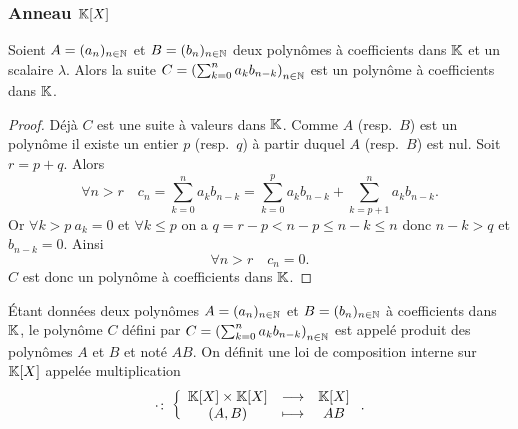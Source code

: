 \subsubsection{Anneau \(\mathbb{K}[X]\)}

\begin{lemme}
  Soient \(A = (a_n)_{n \in \mathbb{N}}\) et \(B = (b_n)_{n \in \mathbb{N}}\) deux polynômes à
  coefficients dans \(\mathbb{K}\) et un scalaire \(\lambda\). Alors la suite \(C =
  \left(\sum_{k = 0}^n a_kb_{n-k}\right)_{n \in \mathbb{N}}\) est un polynôme à
  coefficients dans \(\mathbb{K}\).
\end{lemme}
\begin{proof}
  Déjà \(C\) est une suite à valeurs dans \(\mathbb{K}\). Comme \(A\) (resp.\ \(B\)) est
  un polynôme il existe un entier \(p\) (resp.\ \(q\)) à partir duquel \(A\)
  (resp.\ \(B\)) est nul. Soit \(r = p+q\). Alors
  \begin{equation}
    \forall n>r \quad c_n = \sum_{k = 0}^n a_kb_{n-k} = \sum_{k = 0}^p a_kb_{n-k} +
    \sum_{k = p+1}^n a_kb_{n-k}.
  \end{equation}
  Or \(\forall k>p \ a_k = 0\) et \(\forall k \leqslant p\) on a \(q = r-p <n-p
  \leqslant n-k \leqslant n\) donc \(n-k>q\) et \(b_{n-k} = 0\). Ainsi
  \begin{equation}
    \forall n>r \quad c_n = 0.
  \end{equation}
  \(C\) est donc un polynôme à coefficients dans \(\mathbb{K}\).
\end{proof}

\begin{defdef}
  Étant données deux polynômes \(A = (a_n)_{n \in \mathbb{N}}\) et \(B = (b_n)_{n \in \mathbb{N}}\)
  à coefficients dans \(\mathbb{K}\), le polynôme \(C\) défini par \(C =
  \left(\sum_{k = 0}^n a_kb_{n-k}\right)_{n \in \mathbb{N}}\) est appelé produit des
  polynômes \(A\) et \(B\) et noté \(AB\). On définit une loi de composition
  interne sur \(\mathbb{K}[X]\) appelée multiplication
  \begin{equation}
    \cdot\colon\left\{\begin{array}{ccc}\mathbb{K}[X]\times\mathbb{K}[X] & \longrightarrow &\mathbb{K}[X]\\(A,B) & \longmapsto & AB\end{array}\right..
  \end{equation}
\end{defdef}

